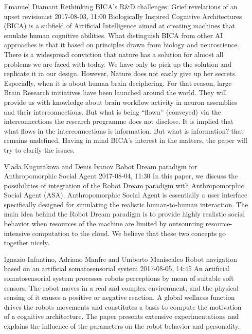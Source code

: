 \documentclass[10pt,fleqn,openany]{book} %
\begin{document}
\begin{enumerate}
		
		\paperabstract
		{Emanuel Diamant}
		{Rethinking BICA's R\&D challenges: Grief revelations of an upset revisionist}
		{2017-08-03, 11:00}
		{Biologically Inspired Cognitive Architectures (BICA) is a subfield of Artificial Intelligence aimed at creating machines that emulate human cognitive abilities. What distinguish BICA from other AI approaches is that it based on principles drawn from biology and neuroscience. There is a widespread conviction that nature has a solution for almost all problems we are faced with today. We have only to pick up the solution and replicate it in our design. However, Nature does not easily give up her secrets. Especially, when it is about human brain deciphering. For that reason, large Brain Research initiatives have been launched around the world. They will provide us with knowledge about brain workflow activity in neuron assemblies and their interconnections. But what is being ``flown'' (conveyed) via the interconnections the research programme does not disclose. It is implied that what flows in the interconnections is information. But what is information?  that remains undefined. Having in mind BICA's interest in the matters, the paper will try to clarify the issues.}
		
		
		\paperabstract
		{Vlada Kugurakova and Denis Ivanov}
		{Robot Dream paradigm for Anthropomorphic Social Agent}
		{2017-08-04, 11:30}
		{In this paper, we discuss the possibilities of integration of the Robot Dream paradigm with Anthropomorphic Social Agent (ASA). Anthropomorphic Social Agent is essentially a user interface specifically designed for simulating the realistic human-to-human interaction. The main idea behind the Robot Dream paradigm is to provide highly realistic social behavior when resources of the machine are limited by outsourcing resource-intensive computation to the cloud. We believe that these two concepts go together nicely.}
		
		
		\paperabstract
		{Ignazio Infantino, Adriano Manfre and Umberto Maniscalco}
		{Robot navigation based on an artificial somatosensorial system}
		{2017-08-05, 14:45}
		{An artificial somatosensorial system processes robots perceptions by mean of suitable soft sensors. The robot moves in a real and complex environment,  and the physical sensing of it causes a positive or negative reaction. A global wellness function drives the robots movements and constitutes a basis to compute the motivation of a cognitive architecture. The paper presents extensive experimentations and explains the influence of the parameters on the robot behavior and personality.}
		

\end{enumerate}
\end{document}
